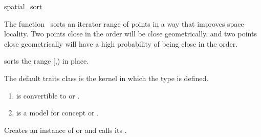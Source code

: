 

\begin{ccRefFunction}{spatial_sort}  %


\ccDefinition
  
The function \ccRefName\ sorts an iterator range of points in a way that
improves space locality. Two points close in the order will be close
geometrically, and two points close geometrically will have a high probability
of being close in the order.


%
                 {sorts the range [,) in place.}
                 
The default traits class  is the kernel in which the type
 is defined.

\begin{enumerate}
\item  {} is convertible to
 or .
\item    {} is a model for concept  or .
\end{enumerate}


\ccImplementation

Creates an instance of 
or  and calls its .



\end{ccRefFunction}


